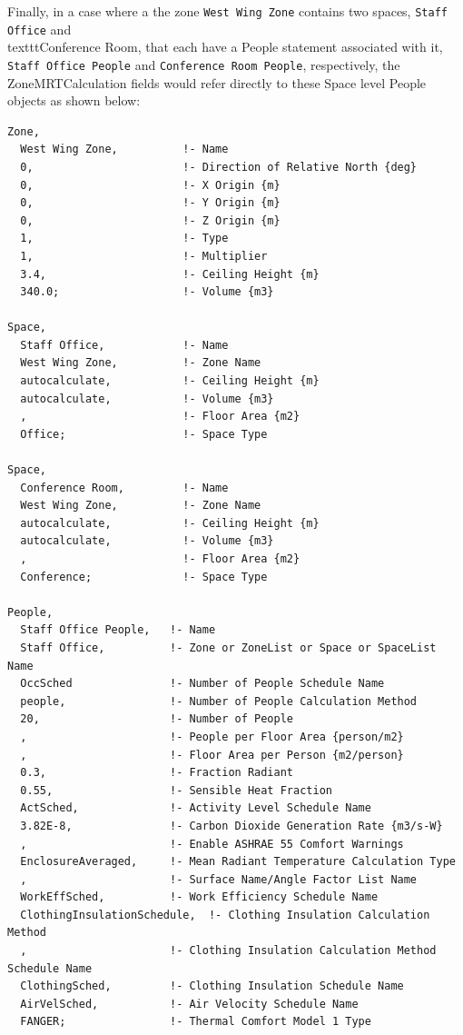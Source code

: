 Finally, in a case where a the zone \texttt{West Wing Zone} contains two spaces, \texttt{Staff Office} and \\texttt{Conference Room}, that each have a People statement associated with it, \texttt{Staff Office People} and \texttt{Conference Room People}, respectively, the ZoneMRTCalculation fields would refer directly to these Space level People objects as shown below:

\begin{lstlisting}
Zone,
  West Wing Zone,          !- Name
  0,                       !- Direction of Relative North {deg}
  0,                       !- X Origin {m}
  0,                       !- Y Origin {m}
  0,                       !- Z Origin {m}
  1,                       !- Type
  1,                       !- Multiplier
  3.4,                     !- Ceiling Height {m}
  340.0;                   !- Volume {m3}

Space,
  Staff Office,            !- Name
  West Wing Zone,          !- Zone Name
  autocalculate,           !- Ceiling Height {m}
  autocalculate,           !- Volume {m3}
  ,                        !- Floor Area {m2}
  Office;                  !- Space Type

Space,
  Conference Room,         !- Name
  West Wing Zone,          !- Zone Name
  autocalculate,           !- Ceiling Height {m}
  autocalculate,           !- Volume {m3}
  ,                        !- Floor Area {m2}
  Conference;              !- Space Type

People,
  Staff Office People,   !- Name
  Staff Office,          !- Zone or ZoneList or Space or SpaceList Name
  OccSched               !- Number of People Schedule Name
  people,                !- Number of People Calculation Method
  20,                    !- Number of People
  ,                      !- People per Floor Area {person/m2}
  ,                      !- Floor Area per Person {m2/person}
  0.3,                   !- Fraction Radiant
  0.55,                  !- Sensible Heat Fraction
  ActSched,              !- Activity Level Schedule Name
  3.82E-8,               !- Carbon Dioxide Generation Rate {m3/s-W}
  ,                      !- Enable ASHRAE 55 Comfort Warnings
  EnclosureAveraged,     !- Mean Radiant Temperature Calculation Type
  ,                      !- Surface Name/Angle Factor List Name
  WorkEffSched,          !- Work Efficiency Schedule Name
  ClothingInsulationSchedule,  !- Clothing Insulation Calculation Method
  ,                      !- Clothing Insulation Calculation Method Schedule Name
  ClothingSched,         !- Clothing Insulation Schedule Name
  AirVelSched,           !- Air Velocity Schedule Name
  FANGER;                !- Thermal Comfort Model 1 Type


\end{lstlisting}
